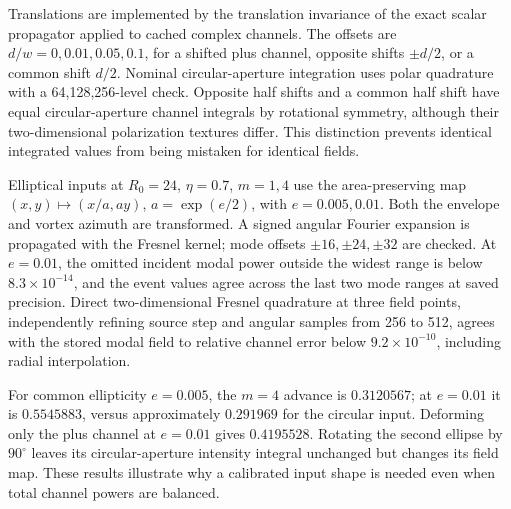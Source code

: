 Translations are implemented by the translation invariance of the exact
scalar propagator applied to cached complex channels. The offsets are
$d/w=0,0.01,0.05,0.1$, for a shifted plus channel, opposite shifts
$\pm d/2$, or a common shift $d/2$. Nominal circular-aperture integration
uses polar quadrature with a 64,128,256-level check. Opposite half shifts
and a common half shift have equal circular-aperture channel integrals
by rotational symmetry, although their two-dimensional polarization
textures differ. This distinction prevents identical integrated values
from being mistaken for identical fields.

Elliptical inputs at $R_0=24$, $\eta=0.7$, $m=1,4$ use the area-preserving
map $(x,y)\mapsto(x/a,ay)$, $a=\exp(e/2)$, with
$e=0.005,0.01$. Both the envelope and vortex azimuth are transformed.
A signed angular Fourier expansion is propagated with the Fresnel kernel;
mode offsets $\pm16,\pm24,\pm32$ are checked. At $e=0.01$, the
omitted incident modal power outside the widest range is below
$8.3\times10^{-14}$, and the event values agree across the last two
mode ranges at saved precision. Direct two-dimensional Fresnel quadrature
at three field points, independently refining source step and angular
samples from 256 to 512, agrees with the stored modal field to relative
channel error below $9.2\times10^{-10}$, including radial interpolation.

For common ellipticity $e=0.005$, the $m=4$ advance is $0.3120567$;
at $e=0.01$ it is $0.5545883$, versus approximately $0.291969$ for
the circular input. Deforming only the plus channel at $e=0.01$ gives
$0.4195528$. Rotating the second ellipse by $90^\circ$ leaves its
circular-aperture intensity integral unchanged but changes its field map.
These results illustrate why a calibrated input shape is needed even
when total channel powers are balanced.
